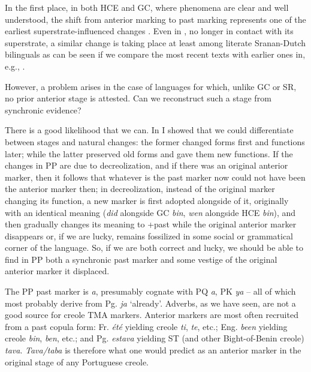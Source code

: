 In the first place, in both HCE and GC, where  phenomena are clear and well understood, the shift from anterior mark\-ing to past marking represents one of the earliest superstrate-influenced changes \citep{Bickerton1975,Bickerton1977}. Even in , no longer in contact with its superstrate, a similar change is taking place at least among literate Sranan-Dutch bilinguals as can be seen if we compare the most recent texts with earlier ones in, e.g., \citet{Voorhoeve1976}.

However, a problem arises in the case of languages for which, unlike GC or SR, no prior anterior stage is attested. Can we reconstruct such a stage from synchronic evidence?

There is a good likelihood that we can. In \citet{Bickerton1980} I showed that we could differentiate between  stages and natural changes: the former changed forms first and functions later; while the latter preserved old forms and gave them new functions. If the changes in PP are due to decreolization, and if there was an original anterior marker, then it follows that whatever is the past
marker now could not have been the anterior marker then; in decreoli\-zation, instead of the original marker changing its function, a new marker is first adopted alongside of it, originally with an identical meaning (\textit{did} alongside GC \textit{bin}, \textit{wen} alongside HCE \textit{bin}), and then gradually changes its meaning to +past while the original anterior marker disappears or, if we are lucky, remains fossilized in some social or grammatical corner of the language. So, if we are both correct and lucky, we should be able to find in PP both a synchronic past marker and some vestige of the original anterior marker it displaced.

The PP past marker is \textit{a}, presumably cognate with PQ \textit{a}, PK \textit{ya} -- all of which most probably derive from Pg. \textit{ja} `already'. Adverbs, as we have seen, are not a good source for creole TMA markers. Anterior markers are most often recruited from a past copula form: Fr. \textit{été} yielding  creole \textit{ti}, \textit{te}, etc.; Eng. \textit{been} yielding  creole \textit{bin}, \textit{ben}, etc.; and Pg. \textit{estava} yielding ST (and other Bight-of-Benin creole) \textit{tava}. \textit{Tava/taba} is therefore what one would predict as an anterior marker in the original stage of any Portuguese creole.

